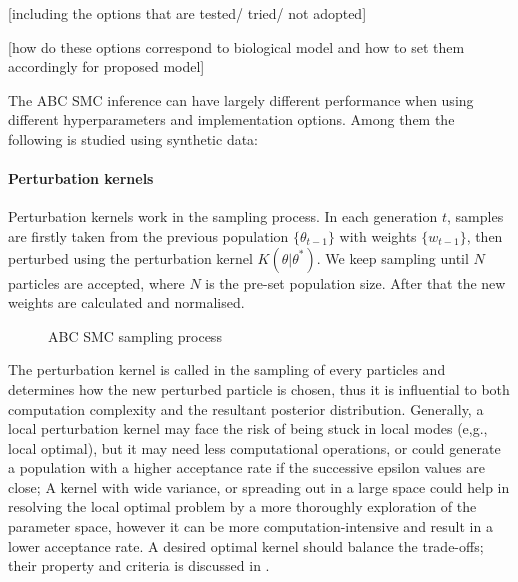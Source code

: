 \documentclass[12pt,a4paper]{report}
\begin{document}
[including the options that are tested/ tried/ not adopted]

[how do these options correspond to biological model and how to set them accordingly for proposed model]

The ABC SMC inference can have largely different performance when using different hyperparameters and implementation options. Among them the following is studied using synthetic data:

\paragraph{Perturbation kernels}

Perturbation kernels work in the sampling process. In each generation $t$, samples are firstly taken from the previous population $\{\theta_{t-1}\}$ with weights $\{w_{t-1}\}$, then perturbed using the perturbation kernel $K(\theta|\theta^*)$. We keep sampling until $N$ particles are accepted, where $N$ is the pre-set population size. After that the new weights are calculated and normalised. 

\begin{figure}
    \begin{center}
    \end{center}
    
    \caption{ABC SMC sampling process} 
    \label{fig:smc}
    
\end{figure}

The perturbation kernel is called in the sampling of every particles and determines how the new perturbed particle is chosen, thus it is influential to both computation complexity and the resultant posterior distribution. Generally, a local perturbation kernel may face the risk of being stuck in local modes (e,g., local optimal), but it may need less computational operations, or could generate a population with a higher acceptance rate if the successive epsilon values are close; A kernel with wide variance, or spreading out in a large space could help in resolving the local optimal problem by a more thoroughly exploration of the parameter space, however it can be more computation-intensive and result in a lower acceptance rate. A desired optimal kernel should balance the trade-offs; their property and criteria is discussed in \cite{ref:kernel}.
\end{document}
